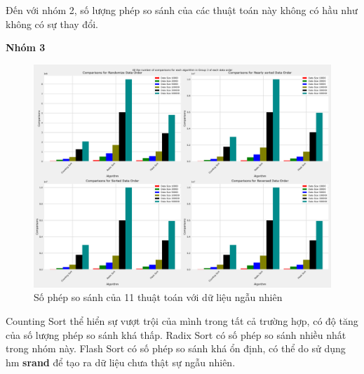 Đến với nhóm 2, số lượng phép so sánh của các thuật toán này không có hầu như không có sự thay đổi. 



\textbf{Nhóm 3}

\begin{figure}[H]
    \centering
    \includegraphics[width=\textwidth]{experimental_result/images/all_the_number_of_comparisons_for_each_algorithm_in_group_3_of_each_data_order.png}
    \caption{Số phép so sánh của 11 thuật toán với dữ liệu ngẫu nhiên}
    \label{fig:all_the_number_of_comparisons_for_each_algorithm_in_group_3_of_each_data_order}
\end{figure}

Counting Sort thể hiển sự vượt trội của mình trong tất cả trường hợp, có độ tăng của số lượng phép so sánh khá thấp. Radix Sort có số phép so sánh nhiều nhất trong nhóm này. Flash Sort có số phép so sánh khá ổn định, có thể do sử dụng hm \textbf{srand} để tạo ra dữ liệu chưa thật sự ngẫu nhiên.
